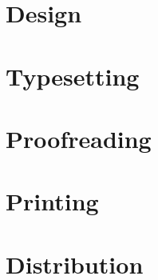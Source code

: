 \documentclass{book}
\begin{document}
\chapter{Design}
\chapter{Typesetting}
\chapter{Proofreading}
\chapter{Printing}
\chapter{Distribution}

\cleardoublepage
\printbibliography[heading=bibintoc]

\cleardoublepage
{}
\printacronyms[heading=none]

\printindex
{}
\end{document}
